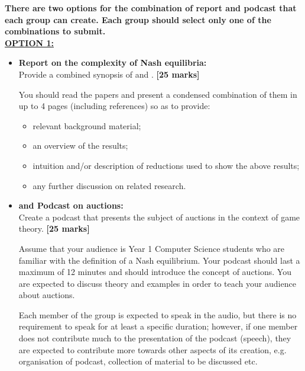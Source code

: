 \documentclass{article}
\begin{document}
\noindent \textbf{There are two options for the combination of report and podcast that each group can create. Each group should select only one of the combinations to submit.}\\[1cm]



\noindent\underline{\textbf{OPTION 1:}}

\begin{itemize}
	\item \textbf{Report on the complexity of Nash equilibria:}\\Provide a combined synopsis of \cite{DGP} and \cite{FPT}. \hfill{\bf [25 marks]}\smallskip
	
	You should read the papers and present a condensed combination of them in up to 4 pages (including references) so as to provide:
	
	\begin{itemize}
		
		\item relevant background material;
		
		\item an overview of the results;
		
		\item intuition and/or description of reductions used to show the above results;
		
		\item any further discussion on related research.
		
	\end{itemize}

	\item \textbf{and Podcast on auctions:}\\Create a podcast that presents the subject of auctions in the context of game theory. \hfill{\bf [25 marks]}\smallskip
	
	Assume that your audience is Year 1 Computer Science students who are familiar with the definition of a Nash equilibrium. Your podcast should last a maximum of 12 minutes and should introduce the concept of auctions. You are expected to discuss theory and examples in order to teach your audience about auctions.
	
	Each member of the group is expected to speak in the audio, but there is no requirement to speak for at least a specific duration; however, if one member does not contribute much to the presentation of the podcast (speech), they are expected to contribute more towards other aspects of its creation, e.g. organisation of podcast, collection of material to be discussed etc.
	

\end{itemize}
\end{document}
